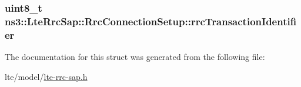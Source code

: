 \subsubsection[{\texorpdfstring{rrc\+Transaction\+Identifier}{rrcTransactionIdentifier}}]{\setlength{\rightskip}{0pt plus 5cm}uint8\+\_\+t ns3\+::\+Lte\+Rrc\+Sap\+::\+Rrc\+Connection\+Setup\+::rrc\+Transaction\+Identifier}\hypertarget{structns3_1_1LteRrcSap_1_1RrcConnectionSetup_a40e8a5a2d7f65d0fed6f4950ea9781c2}{}\label{structns3_1_1LteRrcSap_1_1RrcConnectionSetup_a40e8a5a2d7f65d0fed6f4950ea9781c2}


The documentation for this struct was generated from the following file\+:\begin{DoxyCompactItemize}
\item 
lte/model/\hyperlink{lte-rrc-sap_8h}{lte-\/rrc-\/sap.\+h}\end{DoxyCompactItemize}
